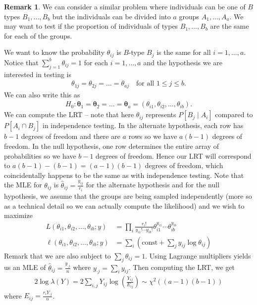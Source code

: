 \documentclass[11pt]{amsart}
\theoremstyle{definition}
\newtheorem{remark}[theorem]{Remark}
\numberwithin{equation}{section}
\begin{document}
\begin{remark}
    We can consider a similar problem where individuals can be one of $B$ types $B_1,\ldots,B_b$ but the individuals can be divided into $a$ groups $A_1,\ldots,A_a$. We may want to test if the proportion of individuals of types $B_1,\ldots,B_b$ are the same for each of the groups.

    We want to know the probability $\theta_{ij}$ is $B$-type $B_j$ is the same for all $i=1,\ldots,a$. Notice that $\sum_{j=1}^b\theta_{ij}=1$ for each $i=1,\ldots,a$ and the hypothesis we are interested in testing is
    \begin{align*}
        \theta_{1j}=\theta_{2j}=\ldots=\theta_{aj}\quad\text{for all }1\le j \le b.
    \end{align*}
    We can also write this as
    \begin{align*}
        H_0:\boldsymbol{\theta}_1=\boldsymbol{\theta}_2=\ldots=\boldsymbol{\theta}_a=(\theta_{i1},\theta_{i2},\ldots,\theta_{ib}).
    \end{align*}
    We can compute the LRT -- note that here $\theta_{ij}$ represents $P[B_j\mid A_i]$ compared to $P[A_i\cap B_j]$ in independence testing. In the alternate hypothesis, each row has $b-1$ degrees of freedom and there are $a$ rows so we have $a(b-1)$ degrees of freedom. In the null hypothesis, one row determines the entire array of probabilities so we have $b-1$ degrees of freedom. Hence our LRT will correspond to $a(b-1)-(b-1)=(a-1)(b-1)$ degrees of freedom, which coincidentally happens to be the same as with independence testing. Note that the MLE for $\theta_{ij}$ is $\hat\theta_{ij}=\frac{y_{ij}}{r_i}$ for the alternate hypothesis and for the null hypothesis, we assume that the groups are being sampled independently (more so as a technical detail so we can actually compute the likelihood) and we wish to maximize
    \begin{align*}
        L(\theta_{i1},\theta_{i2},\ldots,\theta_{ib};y)&=\prod_i\frac{r_i!}{y_{i1}!\cdots y_{ib}!}\theta_{i1}^{y_{i1}}\cdots\theta_{ib}^{y_{ib}}\\
        \ell(\theta_{i1},\theta_{i2},\ldots,\theta_{ib};y)&=\sum_i\left(\mathrm{const} + \sum_jy_{ij}\log\theta_{ij}\right)
    \end{align*}
    Remark that we are also subject to $\sum_{j}\theta_{ij}=1$. Using Lagrange multipliers yields us an MLE of $\hat\theta_{ij}=\frac{y_{\cdot j}}{n}$ where $y_{\cdot j}=\sum_iy_{ij}$. Then computing the LRT, we get
    \begin{align*}
        2\log\lambda(Y)=2\sum_{i,j}Y_{ij}\log(\frac{Y_{ij}}{E_{ij}})\sim\chi^2((a-1)(b-1))
    \end{align*}
    where $E_{ij}=\frac{r_iY_{\cdot j}}{n}$.
\end{remark}
\end{document}
